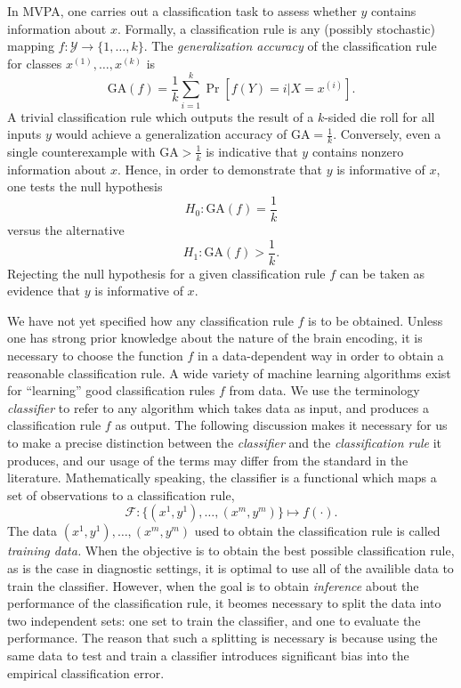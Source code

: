 \documentclass[12pt]{article}
\begin{document}
In MVPA, one carries out a classification task to assess whether $y$
contains information about $x$.  Formally, a classification rule is
any (possibly stochastic) mapping $f: \mathcal{Y} \to \{1,\hdots,
k\}$.  The \emph{generalization accuracy} of the classification rule for classes $x^{(1)},\hdots, x^{(k)}$ is
\[
\text{GA}(f) = \frac{1}{k} \sum_{i=1}^k\Pr[f(Y) = i | X = x^{(i)}].
\]
A trivial classification rule which outputs the result of a $k$-sided
die roll for all inputs $y$ would achieve a generalization accuracy of
$\text{GA} = \frac{1}{k}$.  Conversely, even a single counterexample
with $\text{GA} > \frac{1}{k}$ is indicative that $y$ contains nonzero
information about $x$.  Hence, in order to demonstrate that $y$ is
informative of $x$, one tests the null hypothesis
\[
H_0: \text{GA}(f) = \frac{1}{k}
\]
versus the alternative
\[
H_1: \text{GA}(f) > \frac{1}{k}.
\]
Rejecting the null hypothesis for a given classification rule $f$ can
be taken as evidence that $y$ is informative of $x$.

We have not yet specified how any classification rule $f$ is to be
obtained.  Unless one has strong prior knowledge about the nature of
the brain encoding, it is necessary to choose the function $f$ in a
data-dependent way in order to obtain a reasonable classification
rule.  A wide variety of machine learning algorithms exist for
``learning'' good classification rules $f$ from data.  We use the
terminology \emph{classifier} to refer to any algorithm which takes
data as input, and produces a classification rule $f$ as output.  The
following discussion makes it necessary for us to make a precise
distinction between the \emph{classifier} and the \emph{classification
rule} it produces, and our usage of the terms may differ from the
standard in the literature.  Mathematically speaking, the classifier
is a functional which maps a set of observations to a classification
rule,
\[
\mathcal{F}: \{(x^{1},y^{1}),\hdots, (x^{m}, y^{m})\} \mapsto f(\cdot).
\]
The data $(x^1,y^1),\hdots, (x^m, y^m)$ used to obtain the
classification rule is called \emph{training data.}  When the
objective is to obtain the best possible classification rule, as is
the case in diagnostic settings, it is optimal to use all of the
availible data to train the classifier.  However, when the goal is to
obtain \emph{inference} about the performance of the classification
rule, it beomes necessary to split the data into two independent sets:
one set to train the classifier, and one to evaluate the performance.
The reason that such a splitting is necessary is because using the
same data to test and train a classifier introduces significant bias
into the empirical classification error.
\end{document}
